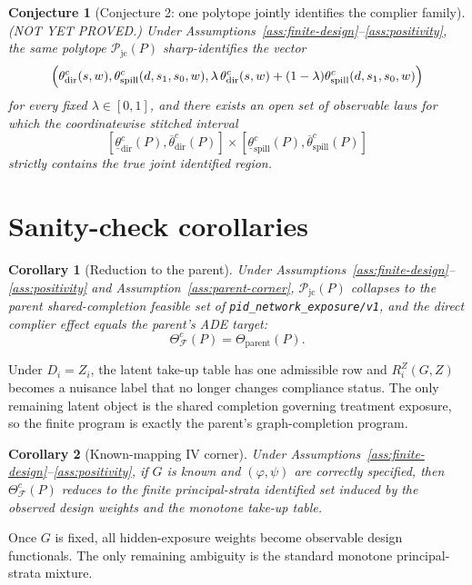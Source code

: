 \documentclass[11pt]{article}
\theoremstyle{definition}
\theoremstyle{plain}
\newtheorem{conjecture}{Conjecture}
\newtheorem{corollary}{Corollary}
\theoremstyle{remark}
\begin{document}
\begin{conjecture}[Conjecture 2: one polytope jointly identifies the complier family]\label{conj:joint-family}
(NOT YET PROVED.) Under Assumptions~\ref{ass:finite-design}--\ref{ass:positivity}, the same polytope \(\mathcal P_{\mathrm{jc}}(P)\) sharp-identifies the vector
\[
\Bigl(
\theta_{\mathrm{dir}}^{c}(s,w),
\theta_{\mathrm{spill}}^{c}(d,s_1,s_0,w),
\lambda\,\theta_{\mathrm{dir}}^{c}(s,w)+(1-\lambda)\theta_{\mathrm{spill}}^{c}(d,s_1,s_0,w)
\Bigr)
\]
for every fixed \(\lambda\in[0,1]\), and there exists an open set of observable laws for which the coordinatewise stitched interval
\[
[\underline\theta_{\mathrm{dir}}^{c}(P),\overline\theta_{\mathrm{dir}}^{c}(P)]
\times
[\underline\theta_{\mathrm{spill}}^{c}(P),\overline\theta_{\mathrm{spill}}^{c}(P)]
\]
strictly contains the true joint identified region.
\end{conjecture}

\section{Sanity-check corollaries}
\begin{corollary}[Reduction to the parent]\label{cor:parent}
Under Assumptions~\ref{ass:finite-design}--\ref{ass:positivity} and Assumption~\ref{ass:parent-corner}, \(\mathcal P_{\mathrm{jc}}(P)\) collapses to the parent shared-completion feasible set of \texttt{pid\_network\_exposure/v1}, and the direct complier effect equals the parent's ADE target:
\[
\Theta^{c}_{\mathcal F}(P)=\Theta_{\mathrm{parent}}(P).
\]
\end{corollary}
Under \(D_i=Z_i\), the latent take-up table has one admissible row and \(R_i^Z(G,Z)\) becomes a nuisance label that no longer changes compliance status. The only remaining latent object is the shared completion governing treatment exposure, so the finite program is exactly the parent's graph-completion program.

\begin{corollary}[Known-mapping IV corner]\label{cor:known-mapping}
Under Assumptions~\ref{ass:finite-design}--\ref{ass:positivity}, if \(G\) is known and \((\varphi,\psi)\) are correctly specified, then \(\Theta^{c}_{\mathcal F}(P)\) reduces to the finite principal-strata identified set induced by the observed design weights and the monotone take-up table.
\end{corollary}
Once \(G\) is fixed, all hidden-exposure weights become observable design functionals. The only remaining ambiguity is the standard monotone principal-strata mixture.
\end{document}

